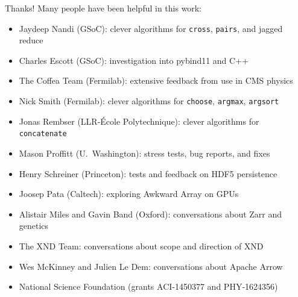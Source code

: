 \documentclass[aspectratio=169]{beamer}
\begin{document}
\begin{frame}{Thanks!}
\vspace{0.35 cm}
Many people have been helpful in this work:
\begin{itemize}
\item Jaydeep Nandi (GSoC): clever algorithms for \texttt{cross}, \texttt{pairs}, and jagged reduce
\item Charles Escott (GSoC): investigation into pybind11 and C++
\item The Coffea Team (Fermilab): extensive feedback from use in CMS physics
\item Nick Smith (Fermilab): clever algorithms for \texttt{choose}, \texttt{argmax}, \texttt{argsort}
\item Jonas Rembser (LLR-\'Ecole Polytechnique): clever algorithms for \texttt{concatenate}
\item Mason Proffitt (U.\ Washington): stress tests, bug reports, and fixes
\item Henry Schreiner (Princeton): tests and feedback on HDF5 persistence
\item Joosep Pata (Caltech): exploring Awkward Array on GPUs
\item Alistair Miles and Gavin Band (Oxford): conversations about Zarr and genetics
\item The XND Team: conversations about scope and direction of XND
\item Wes McKinney and Julien Le Dem: conversations about Apache Arrow
\item National Science Foundation (grants ACI-1450377 and PHY-1624356)
\end{itemize}
\end{frame}
\end{document}
